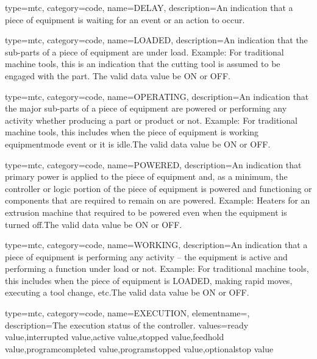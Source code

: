 {
  type=mtc,
  category=code,
  name={DELAY},
  description={An indication that a piece of equipment is waiting for an event or an action to occur.}
}

{
  type=mtc,
  category=code,
  name={LOADED},
  description={An indication that the sub-parts of a piece of equipment are under load. \newline Example: For traditional machine tools, this is an indication that the cutting tool is assumed to be engaged with the part. The \gls{valid data value} \must be ON or OFF.}
}

{
  type=mtc,
  category=code,
  name={OPERATING},
  description={An indication that the major sub-parts of a piece of equipment are powered or performing any activity whether producing a part or product or not.   \newline Example: For traditional machine tools, this includes when the piece of equipment is \gls{working equipmentmode event} or it is idle.The \gls{valid data value} \must be ON or OFF.}
}

{
  type=mtc,
  category=code,
  name={POWERED},
  description={An indication that primary power is applied to the piece of equipment and, as a minimum, the controller or logic portion of the piece of equipment is powered and functioning or components that are required to remain on are powered. Example: Heaters for an extrusion machine that required to be powered even when the equipment is turned off.The \gls{valid data value} \must be ON or OFF.}
}

{
  type=mtc,
  category=code,
  name={WORKING},
  description={An indication that a piece of equipment is performing any activity – the equipment is active and performing a function under load or not. \newline Example: For traditional machine tools, this includes when the piece of equipment is LOADED, making rapid moves, executing a tool change, etc.The \gls{valid data value} \must be ON or OFF.}
}

{
  type=mtc,
  category=code,
  name={EXECUTION},
  elementname=,
  description={The execution status of the \gls{controller}.}
  values={\gls{ready value},\gls{interrupted value},\gls{active value},\gls{stopped value},\gls{feedhold value},\gls{programcompleted value},\gls{programstopped value},\gls{optionalstop value}}
}

